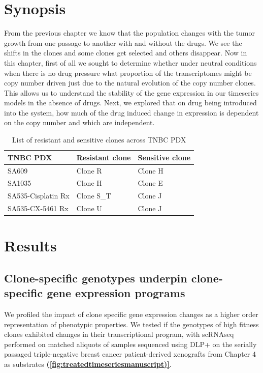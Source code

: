  \section{Synopsis}
 From the previous chapter we know that the population changes with the tumor growth from one passage to another with and without the drugs. We see the shifts in the clones and some clones get selected and others disappear.
 Now in this chapter, first of all we sought to determine whether under neutral conditions when there is no drug pressure what proportion of the transcriptomes might be copy number driven just due to the natural evolution of the copy number clones. This allows us to understand the stability of the gene expression in our timeseries models in the absence of drugs. Next, we explored that on drug being introduced into the system, how much of the drug induced change in expression is dependent on the copy number and which are independent.
   
   
 \begin{table}[htbp]
   
   \centering
   \caption{List of resistant and sensitive clones across TNBC PDX}
     \begin{tabular}{|l|l|l|}
      \hline
     TNBC PDX & Resistant clone & Sensitive clone \\
     \hline
     SA609  & Clone R & Clone H \\
     SA1035 & Clone H & Clone E \\
     SA535-Cisplatin Rx & Clone S\_T & Clone J \\
     SA535-CX-5461 Rx & Clone U & Clone J \\    \hline
     \end{tabular}%
   \label{tab:Listofresistantandsensitiveclones}%
   
  
 \end{table}%



\section{Results}

\subsection{Clone-specific genotypes underpin clone-specific gene expression programs}
We profiled the impact of clone specific gene expression changes as a higher order representation of phenotypic properties. We tested if the genotypes of high fitness clones exhibited changes in their transcriptional program, with scRNAseq performed on matched aliquots of samples sequenced using DLP+ on the serially passaged triple-negative breast cancer patient-derived xenografts from Chapter 4 as substrates \textbf{(\autoref{fig:treatedtimeseriesmanuscript)}}.

